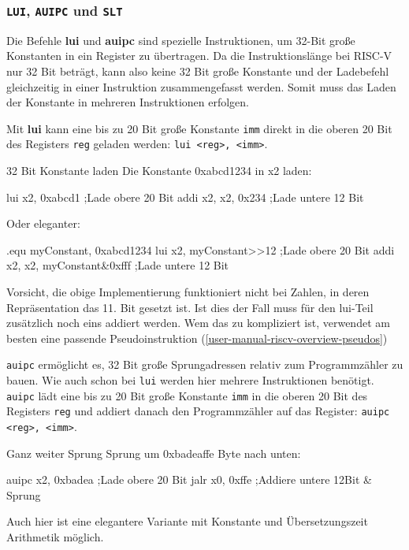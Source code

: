 \subsubsection{\texttt{LUI}, \texttt{AUIPC} und \texttt{SLT}}

Die Befehle \textbf{lui} und \textbf{auipc} sind spezielle Instruktionen, um
32-Bit große Konstanten in ein Register zu übertragen. Da die Instruktionslänge
bei RISC-V nur 32 Bit beträgt, kann also keine 32 Bit große Konstante und der
Ladebefehl gleichzeitig in einer Instruktion zusammengefasst werden. Somit muss
das Laden der Konstante in mehreren Instruktionen erfolgen.

Mit \textbf{lui} kann eine bis zu 20 Bit große Konstante \texttt{imm} direkt in die oberen 20 Bit des Registers \texttt{reg} geladen werden:
\texttt{lui <reg>, <imm>}.

\begin{exampleblock}{32 Bit Konstante laden}
Die Konstante 0xabcd1234 in x2 laden:\\
\begin{riscv}
  lui x2, 0xabcd1 	;Lade obere 20 Bit
  addi x2, x2, 0x234	;Lade untere 12 Bit
\end{riscv}
Oder eleganter:
\begin{riscv}
  .equ myConstant, 0xabcd1234
  lui x2, myConstant>>12        ;Lade obere 20 Bit
  addi x2, x2, myConstant&0xfff ;Lade untere 12 Bit
\end{riscv}

Vorsicht, die obige Implementierung funktioniert nicht bei Zahlen, in deren
Repräsentation das 11. Bit gesetzt ist. Ist dies der Fall muss für den lui-Teil
zusätzlich noch eins addiert werden. Wem das zu kompliziert ist, verwendet am
besten eine passende Pseudoinstruktion
(\autoref{user-manual-riscv-overview-pseudos})

\end{exampleblock}

\texttt{auipc} ermöglicht es, 32 Bit große Sprungadressen relativ zum
Programmzähler zu bauen. Wie auch schon bei \texttt{lui} werden hier mehrere
Instruktionen benötigt. \texttt{auipc} lädt eine bis zu 20 Bit große Konstante
\texttt{imm} in die oberen 20 Bit des Registers \texttt{reg} und addiert danach
den Programmzähler auf das Register: \texttt{auipc <reg>, <imm>}.

\begin{exampleblock}{Ganz weiter Sprung}
Sprung um 0xbadeaffe Byte nach unten:
\begin{riscv}
  auipc x2, 0xbadea	;Lade obere 20 Bit
  jalr x0, 0xffe	;Addiere untere 12Bit & Sprung
\end{riscv}
Auch hier ist eine elegantere Variante mit Konstante und Übersetzungszeit
Arithmetik möglich.
\end{exampleblock}


